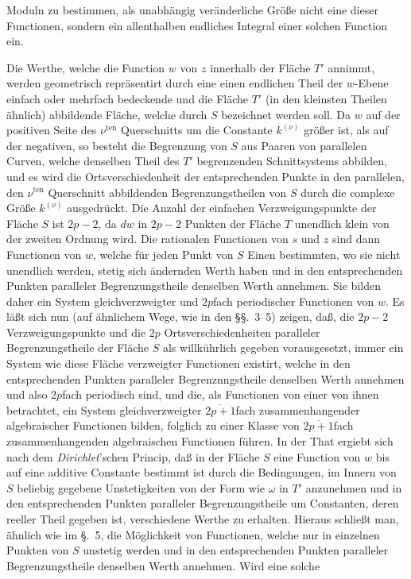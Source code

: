 \documentclass{article}
\begin{document}
Moduln zu bestimmen, als unabhängig veränderliche Größe nicht eine dieser Functionen, sondern ein allenthalben endliches Integral einer solchen Function ein.

Die Werthe, welche die Function $w$ von $z$ innerhalb der Fläche $T'$ annimmt, werden geometrisch repräsentirt durch eine einen endlichen Theil der $w$-Ebene einfach oder mehrfach bedeckende und die Fläche $T'$ (in den kleinsten Theilen ähnlich) abbildende Fläche, welche durch $S$ bezeichnet werden soll. Da $w$ auf der positiven Seite des $\nu^{\text{ten}}$ Querschnitts um die Constante $k^{(\nu)}$ größer ist, als auf der negativen, so besteht die Begrenzung von $S$ aus Paaren von parallelen Curven, welche denselben Theil des $T'$ begrenzenden Schnittsystems abbilden, und es wird die Ortsverschiedenheit der entsprechenden Punkte in den parallelen, den $\nu^{\text{ten}}$ Querschnitt abbildenden Begrenzungstheilen von $S$ durch die complexe Größe $k^{(\nu)}$ ausgedrückt. Die Anzahl der einfachen Verzweigungspunkte der Fläche $S$ ist $2p-2$, da $dw$ in $2p-2$ Punkten der Fläche $T$ unendlich klein von der zweiten Ordnung wird. Die rationalen Functionen von $s$ und $z$ sind dann Functionen von $w$, welche für jeden Punkt von $S$ Einen bestimmten, wo sie nicht unendlich werden, stetig sich ändernden Werth haben und in den entsprechenden Punkten paralleler Begrenzungstheile denselben Werth annehmen. Sie bilden daher ein System gleichverzweigter und $2p$fach periodischer Functionen von $w$. Es läßt sich nun (auf ähnlichem Wege, wie in den §§.~3–5) zeigen, daß, die $2p-2$ Verzweigungspunkte und die $2p$ Ortsverschiedenheiten paralleler Begrenzungstheile der Fläche $S$ als willkührlich gegeben vorausgesetzt, immer ein System wie diese Fläche verzweigter Functionen existirt, welche in den entsprechenden Punkten paralleler Begrenznngstheile denselben Werth annehmen und also $2p$fach periodisch sind, und die, als Functionen von einer von ihnen betrachtet, ein System gleichverzweigter $\overline{2p+1}$fach zusammenhangender algebraischer Functionen bilden, folglich zu einer Klasse von $\overline{2p+1}$fach zusammenhangenden algebraischen Functionen führen. In der That ergiebt sich nach dem \emph{Dirichlet}'schen Princip, daß in der Fläche $S$ eine Function von $w$ bis auf eine additive Constante bestimmt ist durch die Bedingungen, im Innern von $S$ beliebig gegebene Unstetigkeiten von der Form wie $\omega$ in $T'$ anzunehmen und in den entsprechenden Punkten paralleler Begrenzungstheile um Constanten, deren reeller Theil gegeben ist, verschiedene Werthe zu erhalten. Hieraus schließt man, ähnlich wie im §.~5, die Möglichkeit von Functionen, welche nur in einzelnen Punkten von $S$ unstetig werden und in den entsprechenden Punkten paralleler Begrenzungstheile denselben Werth annehmen. Wird eine solche
\end{document}
